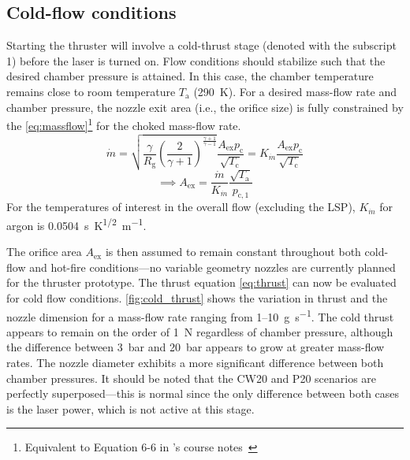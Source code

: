         \subsection{Cold-flow conditions}
            Starting the thruster will involve a cold-thrust stage (denoted with the subscript 1) before the laser is turned on. Flow conditions should stabilize such that the desired chamber pressure is attained. In this case, the chamber temperature remains close to room temperature $T_\mathrm{a}$ (\qty{290}{K}). For a desired mass-flow rate and chamber pressure, the nozzle exit area (i.e., the orifice size) is fully constrained by the \autoref{eq:massflow}\footnote{Equivalent to Equation 6-6 in \citeauthor{zandbergenAE4S01ThermalRocket2020}'s  course notes~\cite{zandbergenAE4S01ThermalRocket2020}} for the choked mass-flow rate.
            \begin{equation} 
                \dot{m} = \sqrt{\frac{\gamma}{R_\mathrm{g}}\left(\frac{2}{\gamma+1}\right)^\frac{\gamma+1}{\gamma-1}}\frac{A_\mathrm{ex}p_\mathrm{c}}{\sqrt{T_\mathrm{c}}} = K_{\dot{m}}\frac{A_\mathrm{ex}p_\mathrm{c}}{\sqrt{T_\mathrm{c}}} \label{eq:massflow}
            \end{equation}
            \begin{equation*}
                \implies A_\mathrm{ex} = \frac{\dot{m}}{K_{\dot{m}}}\frac{\sqrt{T_\mathrm{a}}}{p_\mathrm{c,1}}
            \end{equation*}
            For the temperatures of interest in the overall flow (excluding the LSP), $K_{\dot{m}}$ for argon is \qty{0.0504}{s.K^{1/2}.m^{-1}}. 

            The orifice area $A_\mathrm{ex}$ is then assumed to remain constant throughout both cold-flow and hot-fire conditions---no variable geometry nozzles are currently planned for the thruster prototype. The thrust equation \autoref{eq:thrust} can now be evaluated for cold flow conditions. \autoref{fig:cold_thrust} shows the variation in thrust and the nozzle dimension for a mass-flow rate ranging from 1--10~\unit{g.s^{-1}}. The cold thrust appears to remain on the order of \qty{1}{N} regardless of chamber pressure, although the difference between \qty{3}{bar} and \qty{20}{bar} appears to grow at greater mass-flow rates. The nozzle diameter exhibits a more significant difference between both chamber pressures. It should be noted that the CW20 and P20 scenarios are perfectly superposed---this is normal since the only difference between both cases is the laser power, which is not active at this stage.


